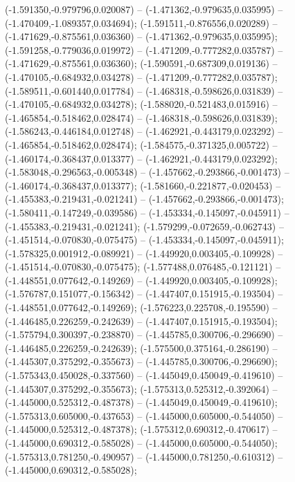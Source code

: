  (-1.591350,-0.979796,0.020087) -- (-1.471362,-0.979635,0.035995) -- (-1.470409,-1.089357,0.034694);
 (-1.591511,-0.876556,0.020289) -- (-1.471629,-0.875561,0.036360) -- (-1.471362,-0.979635,0.035995);
 (-1.591258,-0.779036,0.019972) -- (-1.471209,-0.777282,0.035787) -- (-1.471629,-0.875561,0.036360);
 (-1.590591,-0.687309,0.019136) -- (-1.470105,-0.684932,0.034278) -- (-1.471209,-0.777282,0.035787);
 (-1.589511,-0.601440,0.017784) -- (-1.468318,-0.598626,0.031839) -- (-1.470105,-0.684932,0.034278);
 (-1.588020,-0.521483,0.015916) -- (-1.465854,-0.518462,0.028474) -- (-1.468318,-0.598626,0.031839);
 (-1.586243,-0.446184,0.012748) -- (-1.462921,-0.443179,0.023292) -- (-1.465854,-0.518462,0.028474);
 (-1.584575,-0.371325,0.005722) -- (-1.460174,-0.368437,0.013377) -- (-1.462921,-0.443179,0.023292);
 (-1.583048,-0.296563,-0.005348) -- (-1.457662,-0.293866,-0.001473) -- (-1.460174,-0.368437,0.013377);
 (-1.581660,-0.221877,-0.020453) -- (-1.455383,-0.219431,-0.021241) -- (-1.457662,-0.293866,-0.001473);
 (-1.580411,-0.147249,-0.039586) -- (-1.453334,-0.145097,-0.045911) -- (-1.455383,-0.219431,-0.021241);
 (-1.579299,-0.072659,-0.062743) -- (-1.451514,-0.070830,-0.075475) -- (-1.453334,-0.145097,-0.045911);
 (-1.578325,0.001912,-0.089921) -- (-1.449920,0.003405,-0.109928) -- (-1.451514,-0.070830,-0.075475);
 (-1.577488,0.076485,-0.121121) -- (-1.448551,0.077642,-0.149269) -- (-1.449920,0.003405,-0.109928);
 (-1.576787,0.151077,-0.156342) -- (-1.447407,0.151915,-0.193504) -- (-1.448551,0.077642,-0.149269);
 (-1.576223,0.225708,-0.195590) -- (-1.446485,0.226259,-0.242639) -- (-1.447407,0.151915,-0.193504);
 (-1.575794,0.300397,-0.238870) -- (-1.445785,0.300706,-0.296690) -- (-1.446485,0.226259,-0.242639);
 (-1.575500,0.375164,-0.286190) -- (-1.445307,0.375292,-0.355673) -- (-1.445785,0.300706,-0.296690);
 (-1.575343,0.450028,-0.337560) -- (-1.445049,0.450049,-0.419610) -- (-1.445307,0.375292,-0.355673);
 (-1.575313,0.525312,-0.392064) -- (-1.445000,0.525312,-0.487378) -- (-1.445049,0.450049,-0.419610);
 (-1.575313,0.605000,-0.437653) -- (-1.445000,0.605000,-0.544050) -- (-1.445000,0.525312,-0.487378);
 (-1.575312,0.690312,-0.470617) -- (-1.445000,0.690312,-0.585028) -- (-1.445000,0.605000,-0.544050);
 (-1.575313,0.781250,-0.490957) -- (-1.445000,0.781250,-0.610312) -- (-1.445000,0.690312,-0.585028);
